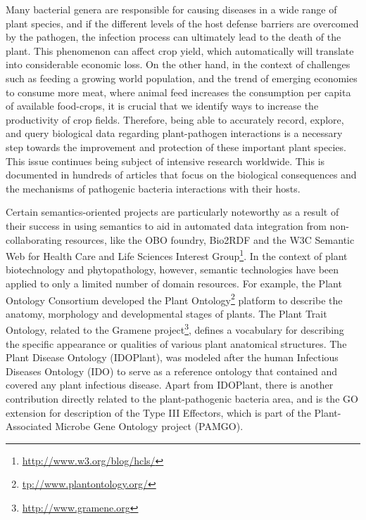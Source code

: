 \documentclass[sw]{iosart2c}
\newcommand{\myurl}[1]{\footnote{\url{#1}}}
\begin{document}
Many bacterial genera are responsible for causing diseases in a wide range of plant species, and if the different levels of the host defense barriers are overcomed by the pathogen, the infection process can ultimately lead to the death of the plant. This phenomenon can affect crop yield, which automatically will translate into considerable economic loss. On the other hand, in the context of challenges such as feeding a growing world population, and the trend of emerging economies to consume more meat, where animal feed increases the consumption per capita of available food-crops, it is crucial that we identify ways to increase the productivity of crop fields. Therefore, being able to accurately record, explore, and query biological data regarding plant-pathogen interactions is a necessary step towards the improvement and protection of these important plant species. This issue continues being subject of intensive research worldwide. This is documented in hundreds of articles that focus on the biological consequences and the mechanisms of pathogenic bacteria interactions with their hosts. 


Certain semantics-oriented projects are particularly noteworthy as a result of their success in using semantics to aid in automated data  integration from non-collaborating resources, like the OBO foundry, Bio2RDF and the W3C Semantic  Web  for Health  Care  and  Life Sciences Interest Group\myurl{http://www.w3.org/blog/hcls/}. In the context of plant biotechnology and phytopathology, however, semantic technologies have been applied to only a limited number of domain resources. For example, the Plant Ontology Consortium developed the Plant Ontology\myurl{tp://www.plantontology.org/} platform to describe the anatomy, morphology and developmental stages of plants.  The Plant Trait Ontology, related to the Gramene project\myurl{http://www.gramene.org}, defines a vocabulary for describing the specific appearance or qualities of various plant anatomical structures. The Plant Disease Ontology (IDOPlant), was modeled after the human Infectious Diseases Ontology (IDO) to serve as a reference ontology that contained and covered any plant infectious disease. Apart from IDOPlant, there is another contribution directly related to the plant-pathogenic bacteria area, and is the GO extension for description of the Type III Effectors, which is part of the Plant-Associated Microbe Gene Ontology project (PAMGO). 
\end{document}
